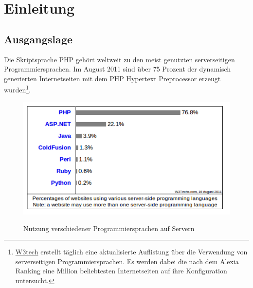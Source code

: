 %
%

\chapter{Einleitung}

\section{Ausgangslage}




Die Skriptsprache PHP gehört weltweit zu den meist genutzten serverseitigen Programmiersprachen. Im August 2011 sind über 75 Prozent der dynamisch generierten Internetseiten mit dem PHP Hypertext Preprocessor erzeugt wurden\footnote{\href{http://w3techs.com/}{W3tech} erstellt täglich eine aktualisierte Auflistung über die Verwendung von serverseitigen Programmiersprachen. Es werden dabei die nach dem Alexia Ranking eine Million beliebtesten Internetseiten auf ihre Konfiguration untersucht.}.


\begin{figure}[!h]
\begin{center}
\label{fig.programmingusage}
\includegraphics[scale=0.65]{images/Einleitung/serverseitigeScriptsprachen.png}
\caption{Nutzung verschiedener Programmiersprachen auf Servern}
\end{center}
\end{figure}

